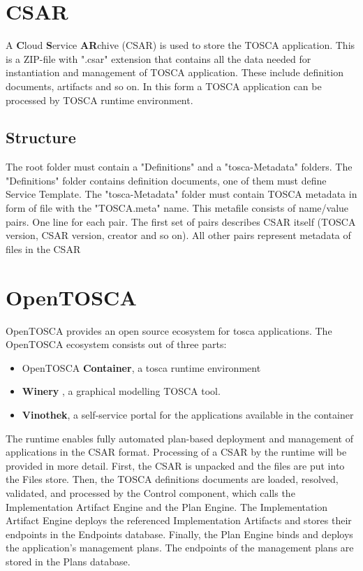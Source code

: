 \section{CSAR} \label{sec:csar}
A \textbf{C}loud \textbf{S}ervice \textbf{AR}chive (CSAR) is used to store the TOSCA application.
This is a ZIP-file with ".csar" extension that contains all the data needed for instantiation and management of TOSCA application.
These include definition documents, artifacts and so on.
In this form a TOSCA application can be processed by TOSCA runtime environment.
\subsection*{Structure}
The root folder must contain a "Definitions" and a "\gls{tosca}-Metadata" folders.
The "Definitions" folder contains definition documents, one of them must define Service Template.
The "\gls{tosca}-Metadata" folder must contain TOSCA metadata in form of file with the "TOSCA.meta" name.
This metafile consists of name/value pairs. 
One line for each pair. 
The first set of pairs describes CSAR itself (TOSCA version, CSAR version, creator and so on). 
All other pairs represent metadata of files in the CSAR

\section{OpenTOSCA} \label{sec:opentosca}
OpenTOSCA provides an open source ecosystem for \gls{tosca} applications. 
The OpenTOSCA ecosystem consists out of three parts: \cite*{OpenTOSCA}
\begin{itemize}
	\item OpenTOSCA \textbf{Container}, a \gls{tosca} runtime environment
	\item \textbf{Winery} \label{tool:winery}, a graphical modelling TOSCA tool.
	\item \textbf{Vinothek}, a self-service portal for the applications available in the container
\end{itemize}
The runtime enables fully automated plan-based deployment and management of applications in the CSAR format. 
Processing of a CSAR by the runtime will be provided in more detail. 
First, the CSAR is unpacked and the files are put into the Files store.
Then, the TOSCA definitions documents are loaded, resolved, validated, and processed by the Control component, which calls the Implementation Artifact Engine and the Plan Engine.
The Implementation Artifact Engine deploys the referenced Implementation Artifacts and stores their endpoints in the Endpoints database. 
Finally, the Plan Engine binds and deploys the application’s management plans.
The endpoints of the management plans are stored in the Plans database.
\cite{INPROC-2013-45}
